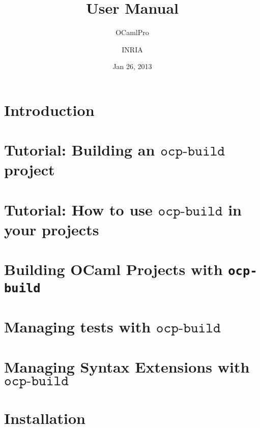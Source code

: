 \documentclass[11pt]{book}
\title{\ocpbuild{} User Manual}
\author{OCamlPro \and INRIA}
\date{Jan 26, 2013}
\newcommand{\cmd}[1]{$\texttt{#1}$}
\newcommand{\ocpbuild}{\cmd{ocp-build}}
\begin{document}
\maketitle
\thispagestyle{empty}
\tableofcontents

\chapter{Introduction}


\chapter{Tutorial: Building an \ocpbuild{} project}


\chapter{Tutorial: How to use \ocpbuild{} in your projects}


\chapter{Building OCaml Projects with {\tt ocp-build}}


\chapter{Managing tests with \ocpbuild{}}


\chapter{Managing Syntax Extensions with \ocpbuild{}}


\chapter{Installation}


%
\end{document}
